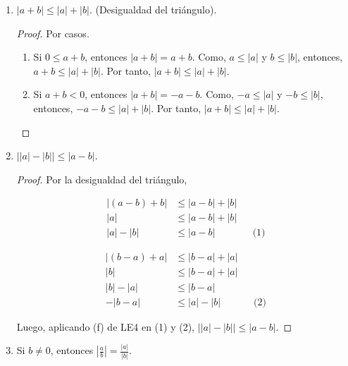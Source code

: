 \documentclass[11pt]{article}
\begin{document}
\begin{enumerate}[label=\alph*)]
\pagebreak

\item $|a+b|\leq |a|+|b|$. (Desigualdad del triángulo).

\vspace{-1em}\begin{proof} 
    Por casos.
    \begin{enumerate}[label=\roman*)]
        \item Si $0 \leq a+b$, entonces $|a+b|=a+b$. Como, $a \leq |a|$ y $b \leq |b|$, entonces, $a+b \leq |a|+|b|$. Por tanto, $|a+b| \leq |a|+|b|$.
        \item Si $a+b<0$, entonces $|a+b|=-a-b$. Como, $-a \leq |a|$ y $-b \leq |b|$, entonces, $-a-b \leq |a|+|b|$. Por tanto, $|a+b| \leq |a|+|b|$. \qedhere
    \end{enumerate}    
\end{proof} \vspace{-1em}

\item $ \big| |a|-|b| \big| \leq |a-b|$.
    \begin{proof} 
    Por la desigualdad del triángulo,
    \begin{center}\vspace{-2.5em}
    \begin{minipage}[t]{.5\linewidth}
    \begin{align*}
    |(a-b)+b| &\leq |a-b|+|b| \\
    |a| &\leq |a-b|+|b| \\
    |a|-|b| &\leq |a-b| && \text{(1)}
    \end{align*}
    \end{minipage}%
    \begin{minipage}[t]{.5\linewidth}
    \begin{align*}
    |(b-a)+a| &\leq |b-a|+|a| \\
    |b| &\leq |b-a|+|a| \\
    |b|-|a| &\leq |b-a| \\
    -|b-a| &\leq |a|-|b| && \text{(2)}
    \end{align*}
    \end{minipage}
    \end{center}
    Luego, aplicando (f) de LE4 en (1) y (2), $\big| |a| - |b| \big| \leq |a-b|$.    
    \end{proof} \vspace{-1em}

\item Si $b\neq 0$, entonces $\left| \frac{a}{b} \right| = \frac{|a|}{|b|}$.


\end{enumerate}
\end{document}

